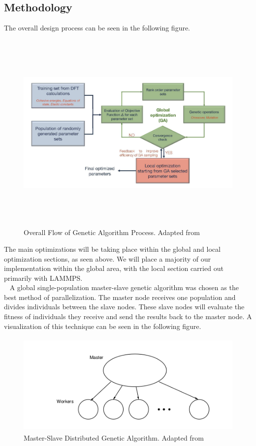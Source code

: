 \documentclass[letterpaper, 12pt]{article}
\begin{document}
\begin{flushleft}
\newpage
\section*{Methodology}
 The overall design process can be seen in the following figure.

 \begin{figure}[H]
 	\includegraphics[width=\linewidth,height=10cm,keepaspectratio]{flowchart.png}
 	\caption[Overall Flow of Genetic Algorithm Process]{Overall Flow of Genetic Algorithm Process. Adapted from \cite{C7NR06038F}}
 	\label{fig:arch}
 \end{figure}

 The main optimizations will be taking place within the global and local optimization sections, as seen above. We will place a majority of our implementation within the global area, with the local section carried out primarily with LAMMPS.\\
 ~\newline 
 A global single-population master-slave genetic algorithm was chosen as the best method of parallelization. The master node receives one population and divides individuals between the slave nodes.  These slave nodes will evaluate the fitness of individuals they receive and send the results back to the master node.  A visualization of this technique can be seen in the following figure.
 
 \begin{figure}[H]
 	\centering
 	\includegraphics[width=\linewidth,height=5cm,keepaspectratio]{model.png}
 	\caption[Master-Slave Genetic Algorithm Implementation]{Master-Slave Distributed Genetic Algorithm. Adapted from \cite{cantu1998survey}}
 	\label{fig:arch}
 \end{figure}



\end{flushleft}
\end{document}
